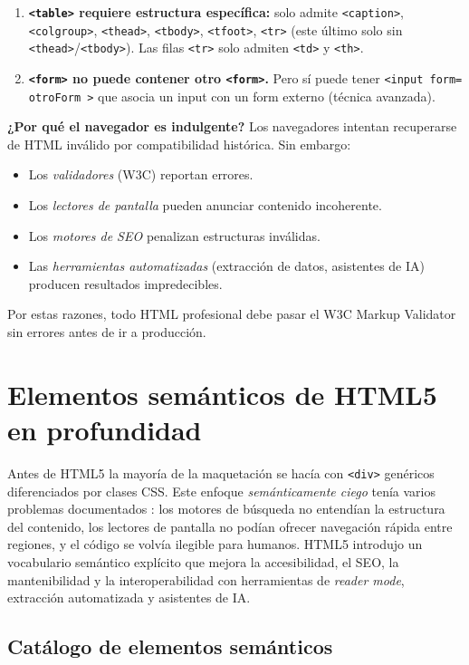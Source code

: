 \documentclass[11pt,a4paper,openany]{book}
\begin{document}
\begin{enumerate}
\item \textbf{\texttt{<table>} requiere estructura específica:}
solo admite \texttt{<caption>}, \texttt{<colgroup>}, \texttt{<thead>},
\texttt{<tbody>}, \texttt{<tfoot>}, \texttt{<tr>} (este último solo
sin \texttt{<thead>}/\texttt{<tbody>}). Las filas \texttt{<tr>} solo
admiten \texttt{<td>} y \texttt{<th>}.

\item \textbf{\texttt{<form>} no puede contener otro \texttt{<form>}.}
Pero sí puede tener \texttt{<input form= otroForm >} que asocia un
input con un form externo (técnica avanzada).
\end{enumerate}

\textbf{¿Por qué el navegador es indulgente?} Los navegadores
intentan recuperarse de HTML inválido por compatibilidad histórica.
Sin embargo:
\begin{itemize}
\item Los \emph{validadores} (W3C) reportan errores.
\item Los \emph{lectores de pantalla} pueden anunciar contenido
incoherente.
\item Los \emph{motores de SEO} penalizan estructuras inválidas.
\item Las \emph{herramientas automatizadas} (extracción de datos,
asistentes de IA) producen resultados impredecibles.
\end{itemize}

Por estas razones, todo HTML profesional debe pasar el W3C Markup
Validator \cite{w3cvalidator} sin errores antes de ir a producción.

\section{Elementos semánticos de HTML5 en profundidad}

Antes de HTML5 la mayoría de la maquetación se hacía con \texttt{<div>}
genéricos diferenciados por clases CSS. Este enfoque
\emph{semánticamente ciego} tenía varios problemas documentados
\cite{lawson2011html5}: los motores de búsqueda no entendían la
estructura del contenido, los lectores de pantalla no podían
ofrecer navegación rápida entre regiones, y el código se volvía
ilegible para humanos. HTML5 introdujo un vocabulario semántico
explícito que mejora la accesibilidad, el SEO, la mantenibilidad y
la interoperabilidad con herramientas de \emph{reader mode},
extracción automatizada y asistentes de IA.

\subsection{Catálogo de elementos semánticos}
\end{document}
